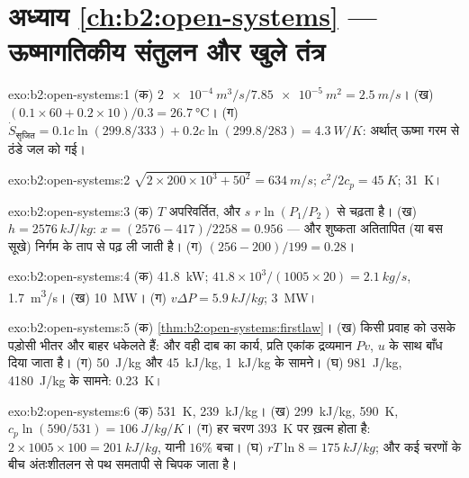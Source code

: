 \section*{अध्याय \ref{ch:b2:open-systems} --- ऊष्मागतिकीय संतुलन और खुले तंत्र}

\begin{solution}{exo:b2:open-systems:1}
(क) $\qty{2e-4}{m^3/s}/\qty{7.85e-5}{m^2} = \qty{2.5}{m/s}$। (ख) $(0.1 \times 60 + 0.2
\times 10)/0.3 = \qty{26.7}{\celsius}$। (ग) $\dot S_{\text{सृजित}} = 0.1c\ln(299.8/333) +
0.2c\ln(299.8/283) = \qty{4.3}{W/K}$: अर्थात् ऊष्मा गरम से ठंडे जल को गई।
\end{solution}

\begin{solution}{exo:b2:open-systems:2}
$\sqrt{2 \times 200 \times 10^3 + 50^2} = \qty{634}{m/s}$; $c^2/2c_p = \qty{45}{K}$;
\qty{31}{K}।
\end{solution}

\begin{solution}{exo:b2:open-systems:3}
(क) $T$ अपरिवर्तित, और $s$ $r\ln(P_1/P_2)$ से चढ़ता है। (ख) $h = \qty{2576}{kJ/kg}$:
$x = (2576 - 417)/2258 = 0.956$ --- और शुष्कता अतितापित (या बस सूखे)
निर्गम के ताप से पढ़ ली जाती है। (ग) $(256 -
200)/199 = 0.28$।
\end{solution}

\begin{solution}{exo:b2:open-systems:4}
(क) \qty{41.8}{kW}; $41.8 \times 10^3/(1005 \times 20) = \qty{2.1}{kg/s}$, \qty{1.7}{m^3/s}।
(ख) \qty{10}{MW}। (ग) $v\Delta P = \qty{5.9}{kJ/kg}$; \qty{3}{MW}।
\end{solution}

\begin{solution}{exo:b2:open-systems:5}
(क) \cref{thm:b2:open-systems:firstlaw}। (ख) किसी प्रवाह को उसके पड़ोसी भीतर
और बाहर धकेलते हैं: और वही दाब का कार्य, प्रति एकांक द्रव्यमान $Pv$,
$u$ के साथ बाँध दिया जाता है। (ग) \qty{50}{J/kg} और \qty{45}{kJ/kg}, \qty{1}{kJ/kg} के सामने।
(घ) \qty{981}{J/kg}, \qty{4180}{J/kg} के सामने: \qty{0.23}{K}।
\end{solution}

\begin{solution}{exo:b2:open-systems:6}
(क) \qty{531}{K}, \qty{239}{kJ/kg}। (ख) \qty{299}{kJ/kg}, \qty{590}{K}, $c_p\ln(590/531)
= \qty{106}{J/kg/K}$। (ग) हर चरण \qty{393}{K} पर ख़त्म होता है: $2 \times 1005 \times 100 =
\qty{201}{kJ/kg}$, यानी $16\%$ बचा। (घ) $rT\ln 8 = \qty{175}{kJ/kg}$; और
कई चरणों के बीच अंतःशीतलन से पथ समतापी से चिपक जाता है।
\end{solution}

